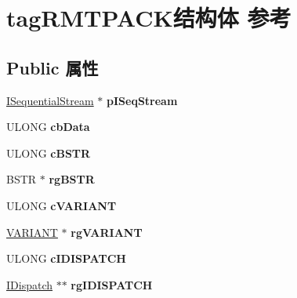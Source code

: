 \hypertarget{structtag_r_m_t_p_a_c_k}{}\section{tag\+R\+M\+T\+P\+A\+C\+K结构体 参考}
\label{structtag_r_m_t_p_a_c_k}
\subsection*{Public 属性}
\begin{DoxyCompactItemize}
\item 
\mbox{\label{structtag_r_m_t_p_a_c_k_adc2bc1b9099818e5f095215d33530ee9}} 
\hyperlink{interface_i_sequential_stream}{I\+Sequential\+Stream} $\ast$ {\bfseries p\+I\+Seq\+Stream}
\item 
\mbox{\label{structtag_r_m_t_p_a_c_k_aa1466e4bbc8ed74df2f40df2c3da5a45}} 
U\+L\+O\+NG {\bfseries cb\+Data}
\item 
\mbox{\label{structtag_r_m_t_p_a_c_k_ad266b9cd185ea6640f996b77544efbb5}} 
U\+L\+O\+NG {\bfseries c\+B\+S\+TR}
\item 
\mbox{\label{structtag_r_m_t_p_a_c_k_a15d818b0ec8b617ece5881e2942a6ada}} 
B\+S\+TR $\ast$ {\bfseries rg\+B\+S\+TR}
\item 
\mbox{\label{structtag_r_m_t_p_a_c_k_a2c4312c6a69ba406bef6e970657ff52d}} 
U\+L\+O\+NG {\bfseries c\+V\+A\+R\+I\+A\+NT}
\item 
\mbox{\label{structtag_r_m_t_p_a_c_k_a4a04f468c0a80952a84cdd04fb7f8b3e}} 
\hyperlink{structtag_v_a_r_i_a_n_t}{V\+A\+R\+I\+A\+NT} $\ast$ {\bfseries rg\+V\+A\+R\+I\+A\+NT}
\item 
\mbox{\label{structtag_r_m_t_p_a_c_k_a54d3becedde896aebc99648b802c6363}} 
U\+L\+O\+NG {\bfseries c\+I\+D\+I\+S\+P\+A\+T\+CH}
\item 
\mbox{\label{structtag_r_m_t_p_a_c_k_a67b870ad3664d6229580f10c79350eb7}} 
\hyperlink{interface_i_dispatch}{I\+Dispatch} $\ast$$\ast$ {\bfseries rg\+I\+D\+I\+S\+P\+A\+T\+CH}
$$
\end{DoxyCompactItemize}
